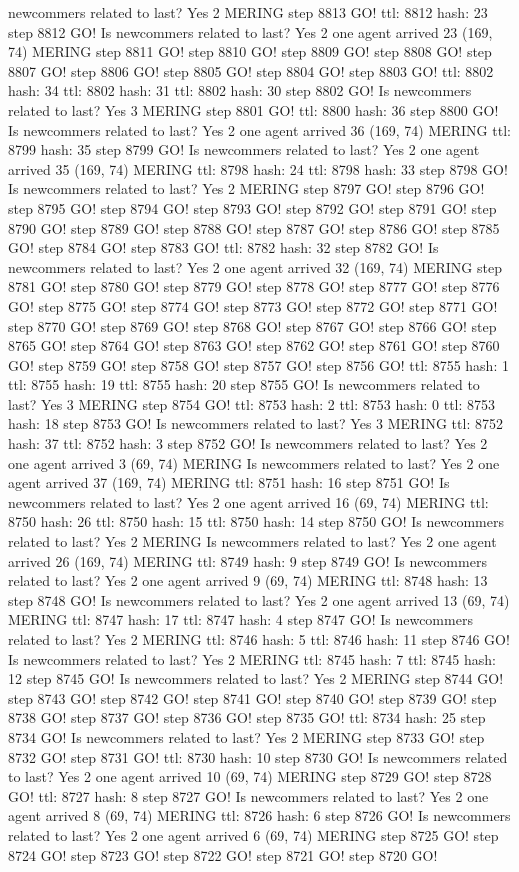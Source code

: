 newcommers related to last? Yes 2 MERING step 8813 GO! ttl: 8812 hash: 23 step 8812 GO! Is newcommers related to last? Yes 2 one agent arrived 23 (169, 74) MERING step 8811 GO! step 8810 GO! step 8809 GO! step 8808 GO! step 8807 GO! step 8806 GO! step 8805 GO! step 8804 GO! step 8803 GO! ttl: 8802 hash: 34 ttl: 8802 hash: 31 ttl: 8802 hash: 30 step 8802 GO! Is newcommers related to last? Yes 3 MERING step 8801 GO! ttl: 8800 hash: 36 step 8800 GO! Is newcommers related to last? Yes 2 one agent arrived 36 (169, 74) MERING ttl: 8799 hash: 35 step 8799 GO! Is newcommers related to last? Yes 2 one agent arrived 35 (169, 74) MERING ttl: 8798 hash: 24 ttl: 8798 hash: 33 step 8798 GO! Is newcommers related to last? Yes 2 MERING step 8797 GO! step 8796 GO! step 8795 GO! step 8794 GO! step 8793 GO! step 8792 GO! step 8791 GO! step 8790 GO! step 8789 GO! step 8788 GO! step 8787 GO! step 8786 GO! step 8785 GO! step 8784 GO! step 8783 GO! ttl: 8782 hash: 32 step 8782 GO! Is newcommers related to last? Yes 2 one agent arrived 32 (169, 74) MERING step 8781 GO! step 8780 GO! step 8779 GO! step 8778 GO! step 8777 GO! step 8776 GO! step 8775 GO! step 8774 GO! step 8773 GO! step 8772 GO! step 8771 GO! step 8770 GO! step 8769 GO! step 8768 GO! step 8767 GO! step 8766 GO! step 8765 GO! step 8764 GO! step 8763 GO! step 8762 GO! step 8761 GO! step 8760 GO! step 8759 GO! step 8758 GO! step 8757 GO! step 8756 GO! ttl: 8755 hash: 1 ttl: 8755 hash: 19 ttl: 8755 hash: 20 step 8755 GO! Is newcommers related to last? Yes 3 MERING step 8754 GO! ttl: 8753 hash: 2 ttl: 8753 hash: 0 ttl: 8753 hash: 18 step 8753 GO! Is newcommers related to last? Yes 3 MERING ttl: 8752 hash: 37 ttl: 8752 hash: 3 step 8752 GO! Is newcommers related to last? Yes 2 one agent arrived 3 (69, 74) MERING Is newcommers related to last? Yes 2 one agent arrived 37 (169, 74) MERING ttl: 8751 hash: 16 step 8751 GO! Is newcommers related to last? Yes 2 one agent arrived 16 (69, 74) MERING ttl: 8750 hash: 26 ttl: 8750 hash: 15 ttl: 8750 hash: 14 step 8750 GO! Is newcommers related to last? Yes 2 MERING Is newcommers related to last? Yes 2 one agent arrived 26 (169, 74) MERING ttl: 8749 hash: 9 step 8749 GO! Is newcommers related to last? Yes 2 one agent arrived 9 (69, 74) MERING ttl: 8748 hash: 13 step 8748 GO! Is newcommers related to last? Yes 2 one agent arrived 13 (69, 74) MERING ttl: 8747 hash: 17 ttl: 8747 hash: 4 step 8747 GO! Is newcommers related to last? Yes 2 MERING ttl: 8746 hash: 5 ttl: 8746 hash: 11 step 8746 GO! Is newcommers related to last? Yes 2 MERING ttl: 8745 hash: 7 ttl: 8745 hash: 12 step 8745 GO! Is newcommers related to last? Yes 2 MERING step 8744 GO! step 8743 GO! step 8742 GO! step 8741 GO! step 8740 GO! step 8739 GO! step 8738 GO! step 8737 GO! step 8736 GO! step 8735 GO! ttl: 8734 hash: 25 step 8734 GO! Is newcommers related to last? Yes 2 MERING step 8733 GO! step 8732 GO! step 8731 GO! ttl: 8730 hash: 10 step 8730 GO! Is newcommers related to last? Yes 2 one agent arrived 10 (69, 74) MERING step 8729 GO! step 8728 GO! ttl: 8727 hash: 8 step 8727 GO! Is newcommers related to last? Yes 2 one agent arrived 8 (69, 74) MERING ttl: 8726 hash: 6 step 8726 GO! Is newcommers related to last? Yes 2 one agent arrived 6 (69, 74) MERING step 8725 GO! step 8724 GO! step 8723 GO! step 8722 GO! step 8721 GO! step 8720 GO! 